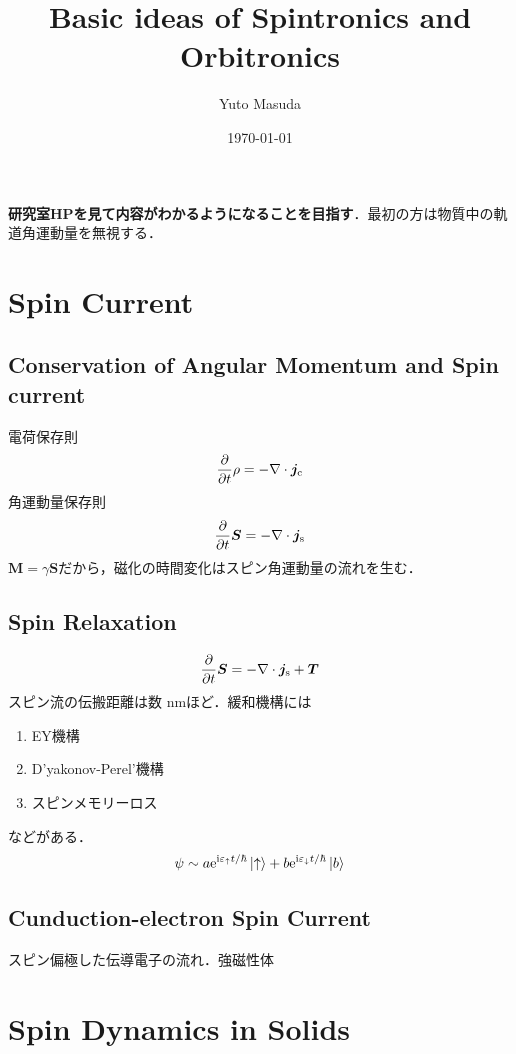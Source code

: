 \documentclass{ltjarticle}
\title{Basic ideas of Spintronics and Orbitronics}
\author{Yuto Masuda}
\date{\today}
\begin{document}
\maketitle

\tableofcontents

\textbf{研究室HPを見て内容がわかるようになることを目指す}．最初の方は物質中の軌道角運動量を無視する．
\section{Spin Current}
\subsection{Conservation of Angular Momentum and Spin current}
電荷保存則
\begin{align}
  \frac{\partial}{\partial t}\rho = -\nabla \cdot \bm{j}_{\mathrm{c}}
\end{align}
角運動量保存則
\begin{align}
  \frac{\partial}{\partial t}\bm{S} = -\nabla\cdot\bm{j}_{\mathrm{s}}
\end{align}
$\bm{M} = \gamma\bm{S}$だから，磁化の時間変化はスピン角運動量の流れを生む．

\subsection{Spin Relaxation}
\begin{align}
  \frac{\partial}{\partial t}\bm{S} = -\nabla\cdot\bm{j}_{\mathrm{s}} + \bm{T}
\end{align}
スピン流の伝搬距離は数 nmほど．緩和機構には
\begin{enumerate}
  \item EY機構
  \item D'yakonov-Perel'機構
  \item スピンメモリーロス
\end{enumerate}
などがある．
\begin{align}
  \psi \sim a\mathrm{e}^{\mathrm{i}\varepsilon_{\uparrow}t/\hbar}\ket{\uparrow} + b\mathrm{e}^{\mathrm{i}\varepsilon_{\downarrow}t/\hbar}\ket{b}
\end{align}
\subsection{Cunduction-electron Spin Current}
スピン偏極した伝導電子の流れ．強磁性体

\section{Spin Dynamics in Solids}
\end{document}
